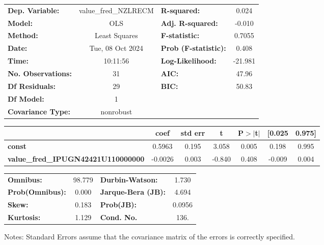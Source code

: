 \begin{center}
\begin{tabular}{lclc}
\toprule
\textbf{Dep. Variable:}                    & value\_fred\_NZLRECM & \textbf{  R-squared:         } &     0.024   \\
\textbf{Model:}                            &         OLS          & \textbf{  Adj. R-squared:    } &    -0.010   \\
\textbf{Method:}                           &    Least Squares     & \textbf{  F-statistic:       } &    0.7055   \\
\textbf{Date:}                             &   Tue, 08 Oct 2024   & \textbf{  Prob (F-statistic):} &    0.408    \\
\textbf{Time:}                             &       10:11:56       & \textbf{  Log-Likelihood:    } &   -21.981   \\
\textbf{No. Observations:}                 &            31        & \textbf{  AIC:               } &     47.96   \\
\textbf{Df Residuals:}                     &            29        & \textbf{  BIC:               } &     50.83   \\
\textbf{Df Model:}                         &             1        & \textbf{                     } &             \\
\textbf{Covariance Type:}                  &      nonrobust       & \textbf{                     } &             \\
\bottomrule
\end{tabular}
\begin{tabular}{lcccccc}
                                           & \textbf{coef} & \textbf{std err} & \textbf{t} & \textbf{P$> |$t$|$} & \textbf{[0.025} & \textbf{0.975]}  \\
\midrule
\textbf{const}                             &       0.5963  &        0.195     &     3.058  &         0.005        &        0.198    &        0.995     \\
\textbf{value\_fred\_IPUGN42421U110000000} &      -0.0026  &        0.003     &    -0.840  &         0.408        &       -0.009    &        0.004     \\
\bottomrule
\end{tabular}
\begin{tabular}{lclc}
\textbf{Omnibus:}       & 98.779 & \textbf{  Durbin-Watson:     } &    1.730  \\
\textbf{Prob(Omnibus):} &  0.000 & \textbf{  Jarque-Bera (JB):  } &    4.694  \\
\textbf{Skew:}          &  0.183 & \textbf{  Prob(JB):          } &   0.0956  \\
\textbf{Kurtosis:}      &  1.129 & \textbf{  Cond. No.          } &     136.  \\
\bottomrule
\end{tabular}
\end{center}

Notes: \newline
 [1] Standard Errors assume that the covariance matrix of the errors is correctly specified.